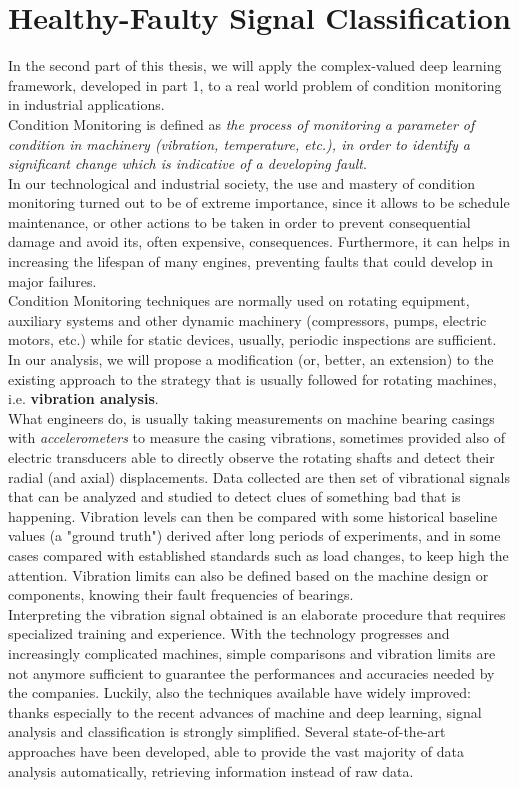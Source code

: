 \documentclass[../main.tex]{subfiles}
\begin{document}
	
\chapter{Healthy-Faulty Signal Classification}
\label{ch:healthy_faulty}

In the second part of this thesis, we will apply the complex-valued deep learning framework, developed in part 1, to a real world problem of condition monitoring in industrial applications.\\
Condition Monitoring is defined as \textit{the process of monitoring a parameter of condition in machinery (vibration, temperature, etc.), in order to identify a significant change which is indicative of a developing fault}.\\
In our technological and industrial society, the use and mastery of condition monitoring turned out to be of extreme importance, since it allows to be schedule maintenance, or other actions to be taken in order to prevent consequential damage and avoid its, often expensive, consequences. Furthermore, it can helps in increasing the lifespan of many engines, preventing faults that could develop in major failures.\\	
Condition Monitoring techniques are normally used on rotating equipment, auxiliary systems and other dynamic machinery (compressors, pumps, electric motors, etc.) while for static devices, usually, periodic inspections are sufficient.\\
In our analysis, we will propose a modification (or, better, an extension) to the existing approach to the strategy that is usually followed for rotating machines, i.e. \textbf{vibration analysis}.\\
What engineers do, is usually taking measurements on machine bearing casings with \textit{accelerometers} to measure the casing vibrations, sometimes provided also of electric transducers able to directly observe the rotating shafts and detect their radial (and axial) displacements. Data collected are then set of vibrational signals that can be analyzed and studied to detect clues of something bad that is happening. Vibration levels can then be compared with some historical baseline values (a "ground truth") derived after long periods of experiments, and in some cases compared with established standards such as load changes, to keep high the attention. Vibration limits can also be defined based on the machine design or components, knowing their fault frequencies of bearings.\\
Interpreting the vibration signal obtained is an elaborate procedure that requires specialized training and experience. With the technology progresses and increasingly complicated machines, simple comparisons and vibration limits are not anymore sufficient to guarantee the performances and accuracies needed by the companies. Luckily, also the techniques available have widely improved: thanks especially to the recent advances of machine and deep learning, signal analysis and classification is strongly simplified. Several state-of-the-art approaches have been developed, able to provide the vast majority of data analysis automatically, retrieving information instead of raw data.\\
\end{document}

